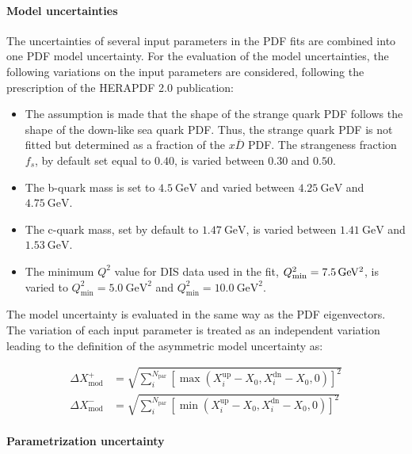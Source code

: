 \paragraph{Model uncertainties} 
The uncertainties of several input parameters in the PDF fits are combined into
one PDF model uncertainty. For the evaluation of the model uncertainties, the
following variations on the input parameters are considered, following the
prescription of the HERAPDF 2.0 publication:
%
\begin{itemize}
\item The assumption is made that the shape of the strange quark PDF follows the
  shape of the down-like sea quark PDF. Thus, the strange quark PDF is not
  fitted but determined as a fraction of the $x\overline{D}$ PDF. The strangeness fraction
  $f_s$, by default set equal to $0.40$, is varied between $0.30$ and $0.50$.
  \item The b-quark mass is set to $\SI{4.5}{\GeV}$ and varied between
  $\SI{4.25}{\GeV}$ and $\SI{4.75}{\GeV}$.
  \item The c-quark mass, set by default to $\SI{1.47}{\GeV}$, is varied between
  $\SI{1.41}{\GeV}$ and $\SI{1.53}{\GeV}$.
  \item The minimum $Q^2$ value for DIS data used in the fit,
    $Q^2_\mathrm{min}=\SI{7.5}{\GeVsq}$, is varied to $Q^2_\mathrm{min} =
    \SI{5.0}{\GeV\squared}$ and $Q^2_\mathrm{min} = \SI{10.0}{\GeV\squared}$.
\end{itemize}
%
The model uncertainty is evaluated in the same way as the PDF eigenvectors.
The variation of each input parameter is treated as an independent variation
leading to the definition of the asymmetric model uncertainty as:

\begin{align*}
  \Delta X^+_{\mathrm{mod}} &= \sqrt{\sum_i^{N_{\mathrm{par}}} \left[ \max(X_i^{\mathrm{up}}
    -X_0, X_i^{\mathrm{dn}} - X_0, 0)\right]^2}\\
    \Delta X^-_{\mathrm{mod}} &= \sqrt{\sum_i^{N_{\mathrm{par}}} \left[ \min(X_i^{\mathrm{up}} - X_0, X_i^{\mathrm{dn}} - X_0,0)\right]^2}
\end{align*}

\paragraph{Parametrization uncertainty}

